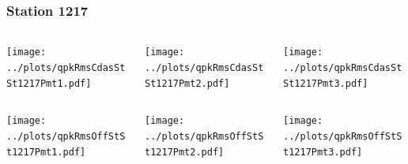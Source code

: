 \documentclass[aspectratio=169]{beamer}
\begin{document}
\begin{frame} 
  \frametitle{Station 1217}
  \begin{center}
    \begin{columns}
      \begin{column}{0.33\textwidth}
        \texttt{[image: ../plots/qpkRmsCdasStSt1217Pmt1.pdf]}
      \end{column}
      \begin{column}{0.33\textwidth}
        \texttt{[image: ../plots/qpkRmsCdasStSt1217Pmt2.pdf]}
      \end{column}
      \begin{column}{0.33\textwidth}
        \texttt{[image: ../plots/qpkRmsCdasStSt1217Pmt3.pdf]}
      \end{column}
    \end{columns}
  \end{center}

  \begin{center}
    \begin{columns}
      \begin{column}{0.33\textwidth}
        \texttt{[image: ../plots/qpkRmsOffStSt1217Pmt1.pdf]}
      \end{column}
      \begin{column}{0.33\textwidth}
        \texttt{[image: ../plots/qpkRmsOffStSt1217Pmt2.pdf]}
      \end{column}
      \begin{column}{0.33\textwidth}
        \texttt{[image: ../plots/qpkRmsOffStSt1217Pmt3.pdf]}
      \end{column}
    \end{columns}
  \end{center}
\end{frame}
\end{document}
